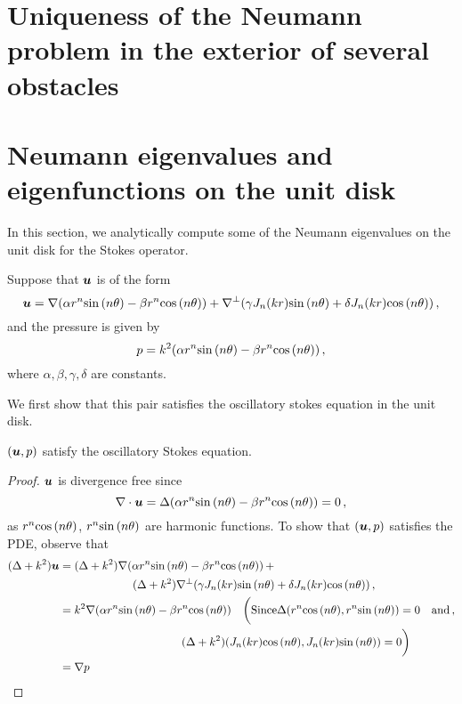 \section{Uniqueness of the Neumann problem in the exterior
  of several obstacles}
\label{app:neuuniqueness}


\section{Neumann eigenvalues and eigenfunctions on the unit disk}
In this section, we analytically compute some of the Neumann eigenvalues
on the unit disk for the Stokes operator.

Suppose that ${\boldsymbol u}$ is of the form
\begin{equation}
{\boldsymbol u} = \nabla (\alpha r^{n} {\sin{(n \theta)}} - \beta r^{n} {\cos{(n \theta)}}) + \nabla^{\perp}(\gamma J_{n}(kr) {\sin{(n \theta)}} + \delta J_{n}(kr) {\cos{(n \theta)}}) \, ,
\end{equation}
and the pressure is given by
\begin{equation}
p = k^2 (\alpha r^{n} {\sin{(n \theta)}} - \beta r^{n} {\cos{(n \theta)}}) \, ,
\end{equation}
where $\alpha,\beta,\gamma,\delta$ are constants.

We first show that this pair satisfies the oscillatory stokes equation
in the unit disk.
\begin{lemma}
$({\boldsymbol u},p)$ satisfy the oscillatory Stokes equation.
\end{lemma}
\begin{proof}
${\boldsymbol u}$ is divergence free since
\begin{equation}
\nabla \cdot {\boldsymbol u}  = \Delta (\alpha r^{n} {\sin{(n \theta)}} - \beta r^{n} {\cos{(n \theta)}}) = 0 \, ,
\end{equation}
as $r^{n} {\cos{(n \theta)}}$,  $r^{n} {\sin{(n \theta)}}$ are harmonic functions. 
To show that $({\boldsymbol u},p)$ satisfies the PDE, observe that
\begin{equation}
\begin{aligned}
(\Delta + k^2) \bu &= (\Delta + k^2) \nabla (\alpha r^{n} \sint - \beta r^{n} \cost) \, + \\
\quad & \hspace*{15ex} (\Delta + k^2) \nabla^{\perp} (\gamma \jnkr \sint + \delta \jnkr \cost) \, , \\
&= k^2 \nabla (\alpha r^{n} \sint - \beta r^{n} \cost) \quad \bigg(\text{Since} \Delta (r^{n}\cost, r^{n}\sint) = 0 \quad
\text{and} \, ,\\
& \hspace*{25ex} (\Delta + k^2) (\jnkr \cost, \jnkr \sint) = 0 \bigg) \\
&= \nabla p
\end{aligned}
\end{equation}
\end{proof}

